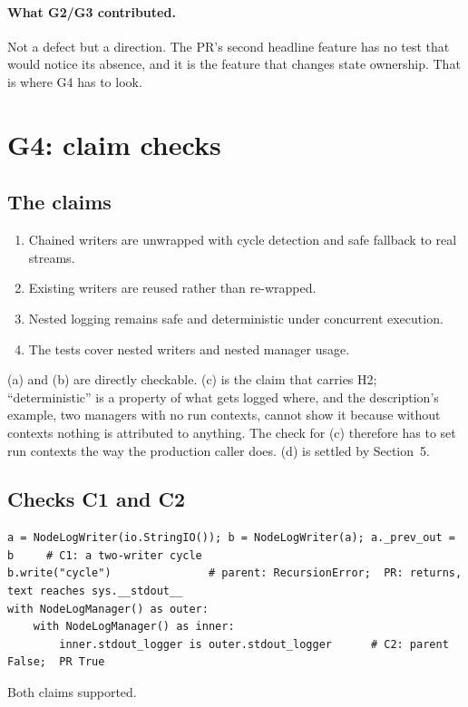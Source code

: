 \documentclass[11pt,a4paper]{article}
\begin{document}
\paragraph{What G2/G3 contributed.} Not a defect but a direction. The PR's second headline feature has no test that would notice its absence, and it is the feature that changes state ownership. That is where G4 has to look.

\section{G4: claim checks}
\label{sec:g4}

\subsection{The claims}
\begin{enumerate}[nosep,label=(\alph*)]
  \item Chained writers are unwrapped with cycle detection and safe fallback to real streams.
  \item Existing writers are reused rather than re-wrapped.
  \item Nested logging remains safe and deterministic under concurrent execution.
  \item The tests cover nested writers and nested manager usage.
\end{enumerate}
(a) and (b) are directly checkable. (c) is the claim that carries H2; ``deterministic'' is a property of what gets logged where, and the description's example, two managers with no run contexts, cannot show it because without contexts nothing is attributed to anything. The check for (c) therefore has to set run contexts the way the production caller does. (d) is settled by Section~5.

\subsection{Checks C1 and C2}
\begin{lstlisting}
a = NodeLogWriter(io.StringIO()); b = NodeLogWriter(a); a._prev_out = b     # C1: a two-writer cycle
b.write("cycle")               # parent: RecursionError;  PR: returns, text reaches sys.__stdout__
with NodeLogManager() as outer:
    with NodeLogManager() as inner:
        inner.stdout_logger is outer.stdout_logger      # C2: parent False;  PR True
\end{lstlisting}
Both claims supported.
\end{document}
